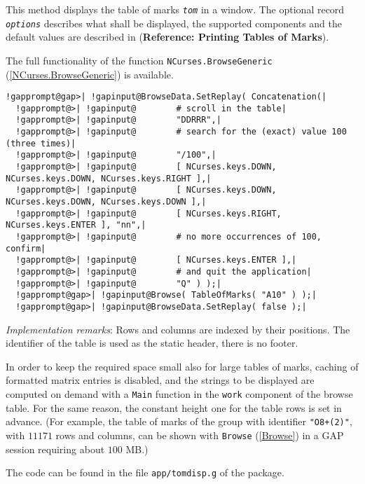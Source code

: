 \documentclass[a4paper,11pt]{report}
\begin{document}
{{{ This method displays the table of marks \mbox{\texttt{\mdseries\slshape tom}} in a window. The optional record \mbox{\texttt{\mdseries\slshape options}} describes what shall be displayed, the supported components and the default
values are described in{\nobreakspace} (\textbf{Reference: Printing Tables of Marks}). 

 The full functionality of the function \texttt{NCurses.BrowseGeneric} (\ref{NCurses.BrowseGeneric}) is available. 

 
\begin{Verbatim}[commandchars=!@|,fontsize=\small,frame=single,label=Example]
  !gapprompt@gap>| !gapinput@BrowseData.SetReplay( Concatenation(|
  !gapprompt@>| !gapinput@        # scroll in the table|
  !gapprompt@>| !gapinput@        "DDRRR",|
  !gapprompt@>| !gapinput@        # search for the (exact) value 100 (three times)|
  !gapprompt@>| !gapinput@        "/100",|
  !gapprompt@>| !gapinput@        [ NCurses.keys.DOWN, NCurses.keys.DOWN, NCurses.keys.RIGHT ],|
  !gapprompt@>| !gapinput@        [ NCurses.keys.DOWN, NCurses.keys.DOWN, NCurses.keys.DOWN ],|
  !gapprompt@>| !gapinput@        [ NCurses.keys.RIGHT, NCurses.keys.ENTER ], "nn",|
  !gapprompt@>| !gapinput@        # no more occurrences of 100, confirm|
  !gapprompt@>| !gapinput@        [ NCurses.keys.ENTER ],|
  !gapprompt@>| !gapinput@        # and quit the application|
  !gapprompt@>| !gapinput@        "Q" ) );|
  !gapprompt@gap>| !gapinput@Browse( TableOfMarks( "A10" ) );|
  !gapprompt@gap>| !gapinput@BrowseData.SetReplay( false );|
\end{Verbatim}
 

 \emph{Implementation remarks}: Rows and columns are indexed by their positions. The identifier of the table
is used as the static header, there is no footer. 

 In order to keep the required space small also for large tables of marks,
caching of formatted matrix entries is disabled, and the strings to be
displayed are computed on demand with a \texttt{Main} function in the \texttt{work} component of the browse table. For the same reason, the constant height one
for the table rows is set in advance. (For example, the table of marks of the
group with identifier \texttt{"O8+(2)"}, with $11171$ rows and columns, can be shown with \texttt{Browse} (\ref{Browse}) in a \textsf{GAP} session requiring about $100$ MB.) 

 The code can be found in the file \texttt{app/tomdisp.g} of the package. }

 }

}
\end{document}
